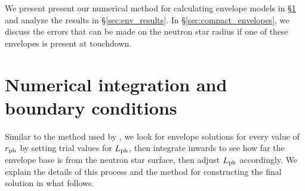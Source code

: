 \documentclass[../main.tex]{subfiles}
\begin{document}
We present present our numerical method for calculating envelope models in \S\ref{sec:env_numerical_integration} and analyze the results in \S\ref{sec:env_results}. In \S\ref{sec:compact_envelopes}, we discuss the errors that can be made on the neutron star radius if one of these envelopes is present at touchdown.


\section{Numerical integration  and boundary conditions}\label{sec:env_numerical_integration}



Similar to the method used by \citet{Paczynski1986a}, we look for envelope solutions for every value of $r_\text{ph}$ by setting trial values for $L_\text{ph}$, then integrate inwards to see how far the envelope base is from the neutron star surface, then adjust $L_\text{ph}$ accordingly. We explain the details of this process and the method for constructing the final solution in what follows. 
\end{document}
